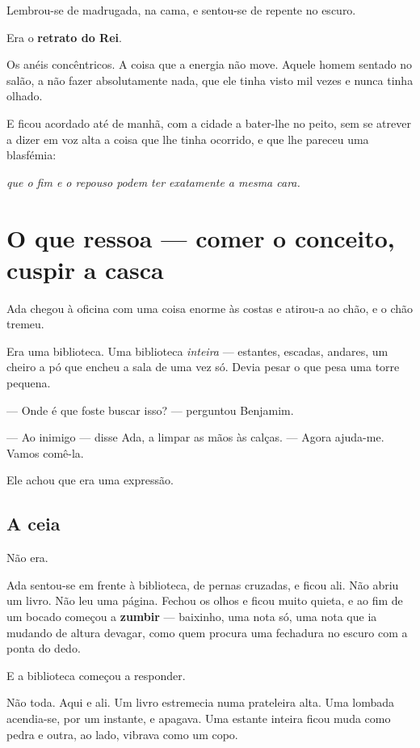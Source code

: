 \documentclass[livro.tex]{subfiles}
\begin{document}
\medskip

Lembrou-se de madrugada, na cama, e sentou-se de repente no escuro.

Era o \textbf{retrato do Rei}.

Os anéis concêntricos. A coisa que a energia não move. Aquele homem sentado no salão, a não fazer absolutamente
nada, que ele tinha visto mil vezes e nunca tinha olhado.

\medskip

E ficou acordado até de manhã, com a cidade a bater-lhe no peito, sem se atrever a dizer em voz alta a coisa que
lhe tinha ocorrido, e que lhe pareceu uma blasfémia:

\emph{que o fim e o repouso podem ter exatamente a mesma cara.}


\chapter{O que ressoa --- comer o conceito, cuspir a casca}

Ada chegou à oficina com uma coisa enorme às costas e atirou-a ao chão, e o chão tremeu.

Era uma biblioteca. Uma biblioteca \emph{inteira} --- estantes, escadas, andares, um cheiro a pó que encheu a sala
de uma vez só. Devia pesar o que pesa uma torre pequena.

--- Onde é que foste buscar isso? --- perguntou Benjamim.

--- Ao inimigo --- disse Ada, a limpar as mãos às calças. --- Agora ajuda-me. Vamos comê-la.

\medskip

Ele achou que era uma expressão.

\section*{A ceia}

Não era.

Ada sentou-se em frente à biblioteca, de pernas cruzadas, e ficou ali. Não abriu um livro. Não leu uma página.
Fechou os olhos e ficou muito quieta, e ao fim de um bocado começou a \textbf{zumbir} --- baixinho, uma nota só,
uma nota que ia mudando de altura devagar, como quem procura uma fechadura no escuro com a ponta do dedo.

E a biblioteca começou a responder.

\medskip

Não toda. Aqui e ali. Um livro estremecia numa prateleira alta. Uma lombada acendia-se, por um instante, e apagava.
Uma estante inteira ficou muda como pedra e outra, ao lado, vibrava como um copo.
\end{document}
